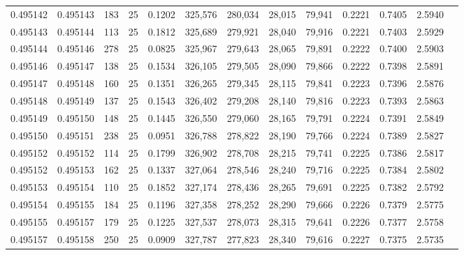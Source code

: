 \begin{tabular}{rrrrrrrrrrrrr}
0.495142 & 0.495143 &   183 &  25 &                                     0.1202 & 325,576 & 280,034 &  28,015 &  79,941 & 0.2221 & 0.7405 & 2.5940 \\
0.495143 & 0.495144 &   113 &  25 &                                     0.1812 & 325,689 & 279,921 &  28,040 &  79,916 & 0.2221 & 0.7403 & 2.5929 \\
0.495144 & 0.495146 &   278 &  25 &                                     0.0825 & 325,967 & 279,643 &  28,065 &  79,891 & 0.2222 & 0.7400 & 2.5903 \\
0.495146 & 0.495147 &   138 &  25 &                                     0.1534 & 326,105 & 279,505 &  28,090 &  79,866 & 0.2222 & 0.7398 & 2.5891 \\
0.495147 & 0.495148 &   160 &  25 &                                     0.1351 & 326,265 & 279,345 &  28,115 &  79,841 & 0.2223 & 0.7396 & 2.5876 \\
0.495148 & 0.495149 &   137 &  25 &                                     0.1543 & 326,402 & 279,208 &  28,140 &  79,816 & 0.2223 & 0.7393 & 2.5863 \\
0.495149 & 0.495150 &   148 &  25 &                                     0.1445 & 326,550 & 279,060 &  28,165 &  79,791 & 0.2224 & 0.7391 & 2.5849 \\
0.495150 & 0.495151 &   238 &  25 &                                     0.0951 & 326,788 & 278,822 &  28,190 &  79,766 & 0.2224 & 0.7389 & 2.5827 \\
0.495152 & 0.495152 &   114 &  25 &                                     0.1799 & 326,902 & 278,708 &  28,215 &  79,741 & 0.2225 & 0.7386 & 2.5817 \\
0.495152 & 0.495153 &   162 &  25 &                                     0.1337 & 327,064 & 278,546 &  28,240 &  79,716 & 0.2225 & 0.7384 & 2.5802 \\
0.495153 & 0.495154 &   110 &  25 &                                     0.1852 & 327,174 & 278,436 &  28,265 &  79,691 & 0.2225 & 0.7382 & 2.5792 \\
0.495154 & 0.495155 &   184 &  25 &                                     0.1196 & 327,358 & 278,252 &  28,290 &  79,666 & 0.2226 & 0.7379 & 2.5775 \\
0.495155 & 0.495157 &   179 &  25 &                                     0.1225 & 327,537 & 278,073 &  28,315 &  79,641 & 0.2226 & 0.7377 & 2.5758 \\
0.495157 & 0.495158 &   250 &  25 &                                     0.0909 & 327,787 & 277,823 &  28,340 &  79,616 & 0.2227 & 0.7375 & 2.5735 \\

\end{tabular}
